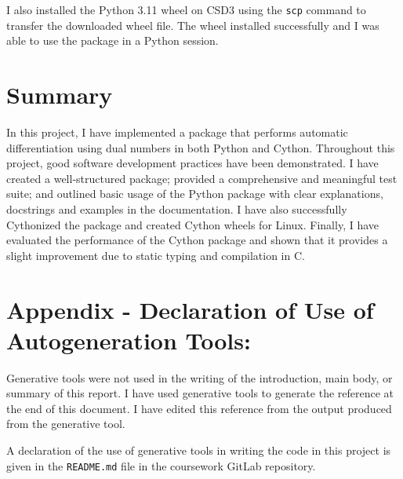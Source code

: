 \documentclass{article}
\begin{document}
I also installed the Python 3.11 wheel on CSD3 using the \texttt{scp} command to transfer the downloaded wheel file. The wheel installed successfully and I was able to use the package in a Python session. 

\section*{Summary}

In this project, I have implemented a package that performs automatic differentiation using dual numbers in both Python and Cython. Throughout this project, good software development practices have been demonstrated. I have created a well-structured package; provided a comprehensive and meaningful test suite; and outlined basic usage of the Python package with clear explanations, docstrings and examples in the documentation. I have also successfully Cythonized the package and created Cython wheels for Linux. Finally, I have evaluated the performance of the Cython package and shown that it provides a slight improvement due to static typing and compilation in C. 

\section*{Appendix - Declaration of Use of Autogeneration Tools:
}

Generative tools were not used in the writing of the introduction, main body, or summary of this report. I have used generative tools to generate the reference at the end of this document. I have edited this reference from the output produced from the generative tool. 

A declaration of the use of generative tools in writing the code in this project is given in the \texttt{README.md} file in the coursework GitLab repository. 



\end{document}
